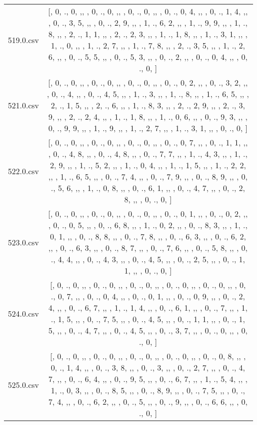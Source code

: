 \begin{table}[ht]
\begin{tabular}{@{}c c@{}}
	519.0.csv & [, 0, ., 0, ,,  , 0, ., 0, ,,  , 0, ., 0, ,,  , 0, ., 0, 4, ,,  , 0, ., 1, 4, ,,  , 0, ., 3, 5, ,,  , 0, ., 2, 9, ,,  , 1, ., 6, 2, ,,  , 1, ., 9, 9, ,,  , 1, ., 8, ,,  , 2, ., 1, 1, ,,  , 2, ., 2, 3, ,,  , 1, ., 1, 8, ,,  , 1, ., 3, 1, ,,  , 1, ., 0, ,,  , 1, ., 2, 7, ,,  , 1, ., 7, 8, ,,  , 2, ., 3, 5, ,,  , 1, ., 2, 6, ,,  , 0, ., 5, 5, ,,  , 0, ., 5, 3, ,,  , 0, ., 2, ,,  , 0, ., 0, 4, ,,  , 0, ., 0, ]\\ 
	521.0.csv & [, 0, ., 0, ,,  , 0, ., 0, ,,  , 0, ., 0, ,,  , 0, ., 0, 2, ,,  , 0, ., 3, 2, ,,  , 0, ., 4, ,,  , 0, ., 4, 5, ,,  , 1, ., 3, ,,  , 1, ., 8, ,,  , 1, ., 6, 5, ,,  , 2, ., 1, 5, ,,  , 2, ., 6, ,,  , 1, ., 8, 3, ,,  , 2, ., 2, 9, ,,  , 2, ., 3, 9, ,,  , 2, ., 2, 4, ,,  , 1, ., 1, 8, ,,  , 1, ., 0, 6, ,,  , 0, ., 9, 3, ,,  , 0, ., 9, 9, ,,  , 1, ., 9, ,,  , 1, ., 2, 7, ,,  , 1, ., 3, 1, ,,  , 0, ., 0, ]\\ 
	522.0.csv & [, 0, ., 0, ,,  , 0, ., 0, ,,  , 0, ., 0, ,,  , 0, ., 0, 7, ,,  , 0, ., 1, 1, ,,  , 0, ., 4, 8, ,,  , 0, ., 4, 8, ,,  , 0, ., 7, 7, ,,  , 1, ., 4, 3, ,,  , 1, ., 2, 9, ,,  , 1, ., 5, 2, ,,  , 1, ., 0, 4, ,,  , 1, ., 1, 5, ,,  , 1, ., 2, 2, ,,  , 1, ., 6, 5, ,,  , 0, ., 7, 4, ,,  , 0, ., 7, 9, ,,  , 0, ., 8, 9, ,,  , 0, ., 5, 6, ,,  , 1, ., 0, 8, ,,  , 0, ., 6, 1, ,,  , 0, ., 4, 7, ,,  , 0, ., 2, 8, ,,  , 0, ., 0, ]\\ 
	523.0.csv & [, 0, ., 0, ,,  , 0, ., 0, ,,  , 0, ., 0, ,,  , 0, ., 0, 1, ,,  , 0, ., 0, 2, ,,  , 0, ., 0, 5, ,,  , 0, ., 6, 8, ,,  , 1, ., 0, 2, ,,  , 0, ., 8, 3, ,,  , 1, ., 0, 1, ,,  , 0, ., 8, 8, ,,  , 0, ., 7, 8, ,,  , 0, ., 6, 3, ,,  , 0, ., 6, 2, ,,  , 0, ., 6, 3, ,,  , 0, ., 8, 7, ,,  , 0, ., 7, 6, ,,  , 0, ., 5, 8, ,,  , 0, ., 4, 4, ,,  , 0, ., 4, 3, ,,  , 0, ., 4, 5, ,,  , 0, ., 2, 5, ,,  , 0, ., 1, 1, ,,  , 0, ., 0, ]\\ 
	524.0.csv & [, 0, ., 0, ,,  , 0, ., 0, ,,  , 0, ., 0, ,,  , 0, ., 0, ,,  , 0, ., 0, ,,  , 0, ., 0, 7, ,,  , 0, ., 0, 4, ,,  , 0, ., 0, 1, ,,  , 0, ., 0, 9, ,,  , 0, ., 2, 4, ,,  , 0, ., 6, 7, ,,  , 1, ., 1, 4, ,,  , 0, ., 6, 1, ,,  , 0, ., 7, ,,  , 1, ., 1, 5, ,,  , 0, ., 7, 5, ,,  , 0, ., 4, 5, ,,  , 0, ., 1, 1, ,,  , 0, ., 1, 5, ,,  , 0, ., 4, 7, ,,  , 0, ., 4, 5, ,,  , 0, ., 3, 7, ,,  , 0, ., 0, ,,  , 0, ., 0, ]\\ 
	525.0.csv & [, 0, ., 0, ,,  , 0, ., 0, ,,  , 0, ., 0, ,,  , 0, ., 0, ,,  , 0, ., 0, 8, ,,  , 0, ., 1, 4, ,,  , 0, ., 3, 8, ,,  , 0, ., 3, ,,  , 0, ., 2, 7, ,,  , 0, ., 4, 7, ,,  , 0, ., 6, 4, ,,  , 0, ., 9, 5, ,,  , 0, ., 6, 7, ,,  , 1, ., 5, 4, ,,  , 1, ., 0, 3, ,,  , 0, ., 8, 5, ,,  , 0, ., 8, 9, ,,  , 0, ., 7, 5, ,,  , 0, ., 7, 4, ,,  , 0, ., 6, 2, ,,  , 0, ., 5, ,,  , 0, ., 9, ,,  , 0, ., 6, 6, ,,  , 0, ., 0, ]\\ 

\end{tabular}
\end{table}

